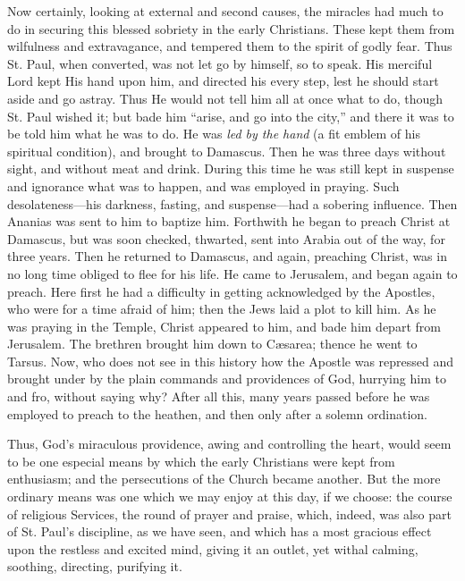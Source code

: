 Now certainly, looking at external and second causes, the miracles
had much to do in securing this blessed sobriety in the early
Christians. These kept them from wilfulness and extravagance, and
tempered them to the spirit of godly fear. Thus St. Paul, when
converted, was not let go by himself, so to speak. His merciful Lord
kept His hand upon him, and directed his every step, lest he should
start aside and go astray. Thus He would not tell him all at once what
to do, though St. Paul wished it; but bade him ``arise, and go
into the city,'' and there it was to be told him what he was to
do. He was \emph{led by the hand} (a fit emblem of his spiritual
condition), and brought to Damascus. Then he was three days without
sight, and without meat and drink. During this time he was still kept
in suspense and ignorance what was to happen, and was employed in
praying. Such desolateness—his darkness, fasting, and suspense—had
a sobering influence. Then Ananias was sent to him to baptize him.
Forthwith he began to preach Christ at Damascus, but was soon checked,
thwarted, sent into Arabia out of the way, for three years. Then he
returned to Damascus, and again, preaching Christ, was in no long
time obliged to flee for his life. He came to Jerusalem, and began
again to preach. Here first he had a difficulty in getting
acknowledged by the Apostles, who were for a time afraid of him; then
the Jews laid a plot to kill him. As he was praying in the Temple,
Christ appeared to him, and bade him depart from Jerusalem. The
brethren brought him down to Cæsarea; thence he went to Tarsus. Now,
who does not see in this history how the Apostle was repressed and
brought under by the plain commands and providences of God, hurrying
him to and fro, without saying why? After all this, many years passed
before he was employed to preach to the heathen, and then only after a
solemn ordination.

Thus, God's miraculous providence, awing and controlling the heart,
would seem to be one especial means by which the early Christians were
kept from enthusiasm; and the persecutions of the Church became
another. But the more ordinary means was one which we may enjoy at
this day, if we choose: the course of religious Services, the round of
prayer and praise, which, indeed, was also part of St. Paul's
discipline, as we have seen, and which has a most gracious effect upon
the restless and excited mind, giving it an outlet, yet withal
calming, soothing, directing, purifying it.

